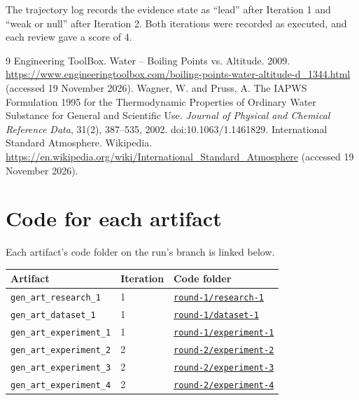 \documentclass[11pt,letterpaper]{article}
\begin{document}
The trajectory log records the evidence state as ``lead'' after Iteration 1 and ``weak or null'' after Iteration 2. Both iterations were recorded as executed, and each review gave a score of 4.

\begin{thebibliography}{9}
 Engineering ToolBox. Water -- Boiling Points vs. Altitude. 2009. \url{https://www.engineeringtoolbox.com/boiling-points-water-altitude-d_1344.html} (accessed 19 November 2026).
 Wagner, W. and Pruss, A. The IAPWS Formulation 1995 for the Thermodynamic Properties of Ordinary Water Substance for General and Scientific Use. \emph{Journal of Physical and Chemical Reference Data}, 31(2), 387--535, 2002. doi:10.1063/1.1461829.
 International Standard Atmosphere. Wikipedia. \url{https://en.wikipedia.org/wiki/International_Standard_Atmosphere} (accessed 19 November 2026).
\end{thebibliography}

\appendix

\section{Code for each artifact}\label{app:code}

Each artifact's code folder on the run's branch is linked below.

\begin{longtable}{p{5.2cm}p{2.2cm}p{7cm}}
\toprule
Artifact & Iteration & Code folder \\
\midrule
\endhead
\texttt{gen\_art\_research\_1} & 1 & \href{https://github.com/ai-inventor-papers/ai-invention-fde7b3-simple-barometric-model-vs-boiling-point/tree/main/round-1/research-1}{\texttt{round-1/research-1}} \\
\texttt{gen\_art\_dataset\_1} & 1 & \href{https://github.com/ai-inventor-papers/ai-invention-fde7b3-simple-barometric-model-vs-boiling-point/tree/main/round-1/dataset-1}{\texttt{round-1/dataset-1}} \\
\texttt{gen\_art\_experiment\_1} & 1 & \href{https://github.com/ai-inventor-papers/ai-invention-fde7b3-simple-barometric-model-vs-boiling-point/tree/main/round-1/experiment-1}{\texttt{round-1/experiment-1}} \\
\texttt{gen\_art\_experiment\_2} & 2 & \href{https://github.com/ai-inventor-papers/ai-invention-fde7b3-simple-barometric-model-vs-boiling-point/tree/main/round-2/experiment-2}{\texttt{round-2/experiment-2}} \\
\texttt{gen\_art\_experiment\_3} & 2 & \href{https://github.com/ai-inventor-papers/ai-invention-fde7b3-simple-barometric-model-vs-boiling-point/tree/main/round-2/experiment-3}{\texttt{round-2/experiment-3}} \\
\texttt{gen\_art\_experiment\_4} & 2 & \href{https://github.com/ai-inventor-papers/ai-invention-fde7b3-simple-barometric-model-vs-boiling-point/tree/main/round-2/experiment-4}{\texttt{round-2/experiment-4}} \\
\bottomrule
\end{longtable}
\end{document}
